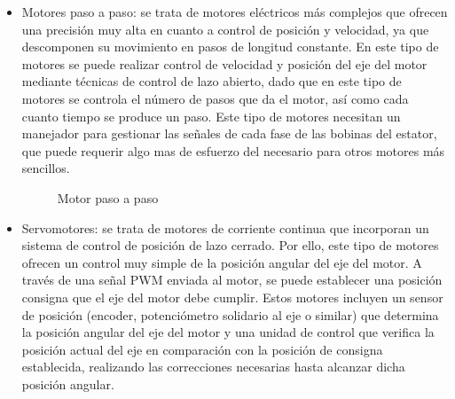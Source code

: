 \begin{itemize}
    \item Motores paso a paso: se trata de motores eléctricos más complejos que ofrecen una precisión muy alta en cuanto a  control de posición y velocidad, ya que descomponen su movimiento en pasos de longitud constante. En este tipo de motores se puede realizar control de velocidad y posición del eje del motor mediante técnicas de control de lazo abierto, dado que en este tipo de motores se controla el número de pasos que da el motor, así como cada cuanto tiempo se produce un paso. Este tipo de motores necesitan un manejador para gestionar las señales de cada fase de las bobinas del estator, que puede requerir algo mas de esfuerzo del necesario para otros motores más sencillos.
    
    \begin{figure}[H]
    \centering
    \caption{Motor paso a paso} \label{fig:lego}
    \end{figure}
  
    \item Servomotores: se trata de motores de corriente continua que incorporan un sistema de control de posición de lazo cerrado. Por ello, este tipo de motores ofrecen un control muy simple de la posición angular del eje del motor. A través de una señal \ac{PWM} enviada al motor, se puede establecer una posición consigna que el eje del motor debe cumplir. Estos motores incluyen un sensor de posición (encoder, potenciómetro solidario al eje o similar) que determina la posición angular del eje del motor y una unidad de control que verifica la posición actual del eje en comparación con la posición de consigna establecida, realizando las correcciones necesarias hasta alcanzar dicha posición angular.
    

\end{itemize}

